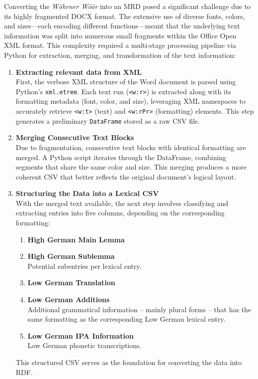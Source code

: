 Converting the \emph{Wöhrner Wöör} into an MRD posed a significant challenge due to its highly fragmented DOCX format. The extensive use of diverse fonts, colors, and sizes—each encoding different functions—meant that the underlying text information was split into numerous small fragments within the Office Open XML format. This complexity required a multi-stage processing pipeline via Python for extraction, merging, and transformation of the text information:

\begin{enumerate}
    \item {\textbf{Extracting relevant data from XML}}\\  
    First, the verbose XML structure of the Word document is parsed using Python’s \texttt{xml.etree}. Each text run (\texttt{<w:r>}) is extracted along with its formatting metadata (font, color, and size), leveraging XML namespaces to accurately retrieve \texttt{<w:t>} (text) and \texttt{<w:rPr>} (formatting) elements. This step generates a preliminary \texttt{DataFrame} stored as a raw CSV file.

    \item {\textbf{Merging Consecutive Text Blocks}}\\  
   Due to fragmentation, consecutive text blocks with identical formatting are merged. A Python script iterates through the DataFrame, combining segments that share the same color and size. This merging produces a more coherent CSV that better reflects the original document’s logical layout.

    \item {\textbf{Structuring the Data into a Lexical CSV}}\\  
    With the merged text available, the next step involves classifying and extracting entries into five columns, depending on the corresponding formatting:
    \begin{enumerate}
        \item {\textbf{High German Main Lemma}}
        \item {\textbf{High German Sublemma}}\\Potential subentries per lexical entry.
        \item {\textbf{Low German Translation}}
        \item {\textbf{Low German Additions}}\\ Additional grammatical information -- mainly plural forms -- that has the same formatting as the corresponding Low German lexical entry.
        \item {\textbf{Low German IPA Information}}\\Low German phonetic transcriptions.
    \end{enumerate}
    This structured CSV serves as the foundation for converting the data into RDF.


\end{enumerate}
